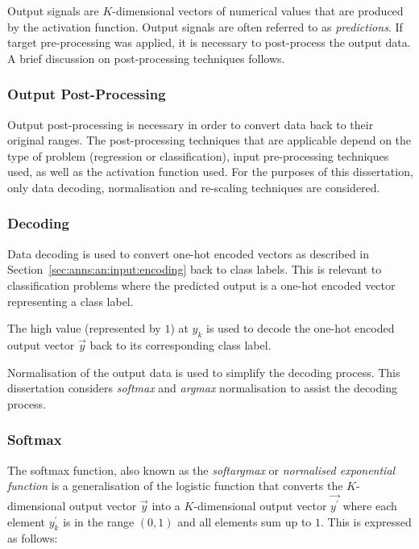 Output signals are $K$-dimensional vectors of numerical values that are produced
by the activation function. Output signals are often
referred to as \textit{predictions}. If target pre-processing was applied, it is
necessary to post-process the output data. A brief discussion on post-processing
techniques follows.

\subsubsection{Output Post-Processing}
\label{sec:anns:an:output:output_post_processing}

Output post-processing is necessary in order to convert data back to their
original ranges. The post-processing techniques that are applicable depend on
the type of problem (regression or classification), input pre-processing
techniques used, as well as the activation function
used. For the purposes of this dissertation, only data decoding, normalisation and
re-scaling techniques are considered.


\subsubsection{Decoding}
\label{sec:anns:an:output:decoding}

Data decoding is used to convert one-hot encoded vectors
as described in Section~\ref{sec:anns:an:input:encoding} back to class labels.
This is relevant to classification problems where the predicted output is a
one-hot encoded vector representing a class label.

The high value (represented by $1$) at $y_k$ is used to decode the
one-hot encoded output vector $\vec{y}$ back to its
corresponding class label.

Normalisation of the output data is used to simplify the decoding process. This
dissertation considers \textit{softmax} and
\textit{argmax} normalisation to assist the decoding process.


\subsubsection{Softmax}
\label{sec:anns:an:output:softmax}

The softmax function, also known as the
\textit{softargmax} \cite[p.~184]{ref:goodfellow:2016} or
\textit{normalised exponential function}
\cite{ref:bishop:2006} is a generalisation of the logistic function that
converts the $K$-dimensional output vector $\vec{y}$ into a $K$-dimensional
output vector $\vec{y^{'}}$ where each element $y^{'}_k$ is in the range $(0,1)$
and all elements sum up to $1$. This is expressed as follows:

